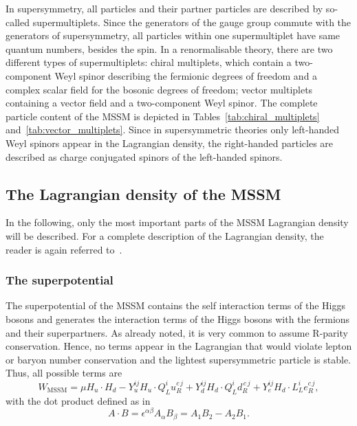 In supersymmetry, all particles and their partner particles are described by so-called supermultiplets.
Since the generators of the gauge group commute with the generators of supersymmetry, all particles within one supermultiplet have same quantum numbers, besides the spin.
In a renormalisable theory, there are two different types of supermultiplets: chiral multiplets, which contain a two-component Weyl spinor describing the fermionic degrees of freedom and a complex scalar field for the bosonic degrees of freedom; vector multiplets containing a vector field and a two-component Weyl spinor.
The complete particle content of the MSSM is depicted in Tables~\ref{tab:chiral_multiplets} and~\ref{tab:vector_multiplets}. 
Since in supersymmetric theories only left-handed Weyl spinors appear in the Lagrangian density, the right-handed particles are described as charge conjugated spinors of the left-handed spinors.


\subsection{The Lagrangian density of the MSSM}
\label{sec:Lagrange_MSSM}
In the following, only the most important parts of the MSSM Lagrangian density will be described.
For a complete description of the Lagrangian density, the reader is again referred to~\cite{bib:Drees_2004}.

\subsubsection*{The superpotential}
The superpotential of the MSSM contains the self interaction terms of the Higgs bosons and generates the interaction terms of the Higgs bosons with the fermions and their superpartners.
As already noted, it is very common to assume R-parity conservation.
Hence, no terms appear in the Lagrangian that would violate lepton or baryon number conservation and the lightest supersymmetric particle is stable.
Thus, all possible terms are
\begin{equation}
\label{eq:SPMSSM}
 W_{\text{MSSM}} = \mu H_u \cdot H_d - Y_u^{ij} H_u \cdot Q_L^i u_R^{c\,j} + Y_d^{ij} H_d \cdot Q_L^i d_R^{\,c\,j} + Y_e^{ij} H_d \cdot L_L^i e_R^{c\,j},
\end{equation}
with the dot product defined as in~\cite{bib:Aitchison_2005} 
\begin{equation}
 A \cdot B = \epsilon^{\alpha\beta} A_{\alpha} B_{\beta} = A_1 B_2 - A_2 B_1.
\end{equation}

